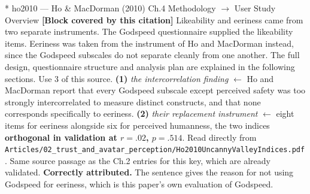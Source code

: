 \documentclass[11pt, a4paper]{article}
\makeatletter
\newcounter{citentry}
\newcommand{\citentry@core}[7]{%
  \stepcounter{citentry}
  \begingroup
  \sbox{\citentry@measurebox}{%
    \begin{minipage}{\linewidth}
      \noindent\colorbox{konstanzblue}{\parbox{\dimexpr\linewidth-2\fboxsep}{%
        \vspace{3pt}
        \textbf{\#\thecitentry \quad #2} \hfill \textit{#3}
        \vspace{3pt}
      }}
      \vspace{3pt}
      \noindent\begin{tabular}{@{}p{2.7cm} p{\dimexpr\linewidth-3cm}@{}}
        \textit{\small Sentence in thesis:} & #4 \\[5pt]
        \textbf{Usage:}\hfill       & #5 \\[5pt]
        \textit{\small Original source:}     & #6 \\[5pt]
        \textbf{How to check:}             & #7 \\
      \end{tabular}
      \vspace{5pt}
      \rule{10pt}{10pt}\quad \textbf{Validated} --- I have read the original and agree it supports the sentence.
    \end{minipage}%
  }%
  \Needspace{\dimexpr\ht\citentry@measurebox+\dp\citentry@measurebox\relax}%
  \endgroup
  \vspace{10pt}
  \noindent\colorbox{konstanzblue}{\parbox{\dimexpr\linewidth-2\fboxsep}{%
    \vspace{3pt}
    \textcolor{white}{\textbf{\#\thecitentry \quad #2}} \hfill \textcolor{white}{\textit{#3}}
    \vspace{3pt}
  }}
  \vspace{3pt}
  \noindent\begin{tabular}{@{}p{2.7cm} p{\dimexpr\linewidth-3cm}@{}}
    \textit{\small Sentence in thesis:} & \textcolor{darkgreen}{#4} \\[5pt]
    \textbf{Usage:}\hfill       & #5 \\[5pt]
    \textit{\small Original source:}     & \textcolor{darkred}{#6} \\[5pt]
    \textbf{How to check:}             & #7 \\
  \end{tabular}
  \vspace{5pt}
  \noindent\CheckBox[name=verified\thecitentry, width=10pt, height=10pt, bordercolor={0 0 0}, borderwidth=0.75, backgroundcolor={1 1 1}#1]{}\quad \textbf{Validated} --- I have read the original and agree it supports the sentence.
  \vspace{3pt}
  \noindent\textcolor{midgray}{\rule{\linewidth}{0.4pt}}
}
\newcommand{\citentry}{\@ifstar{\citentry@core{, checked}}{\citentry@core{}}}
\makeatother
\begin{document}
\begin{Form}
\citentry*
  {ho2010 --- Ho \& MacDorman (2010)}
  {Ch.4 Methodology $\rightarrow$ User Study Overview}
  {\textbf{[Block covered by this citation]} Likeability and eeriness came from two separate instruments. The Godspeed questionnaire supplied the likeability items. Eeriness was taken from the instrument of Ho and MacDorman instead, since the Godspeed subscales do not separate cleanly from one another. The full design, questionnaire structure and analysis plan are explained in the following sections.}
  {Use 3 of this source.}
  {\textbf{(1)} \emph{the intercorrelation finding} $\leftarrow$ Ho and MacDorman report that every Godspeed subscale except perceived safety was too strongly intercorrelated to measure distinct constructs, and that none corresponds specifically to eeriness. \quad \textbf{(2)} \emph{their replacement instrument} $\leftarrow$ eight items for eeriness alongside six for perceived humanness, the two indices \textbf{orthogonal in validation at $r = .02$, $p = .514$}.}
  {Read directly from \texttt{\footnotesize Articles/02\_trust\_and\_avatar\_perception/Ho2010UncannyValleyIndices.pdf}. Same source passage as the Ch.2 entries for this key, which are already validated. \textbf{Correctly attributed.} The sentence gives the reason for not using Godspeed for eeriness, which is this paper's own evaluation of Godspeed.}


\end{Form}
\end{document}
